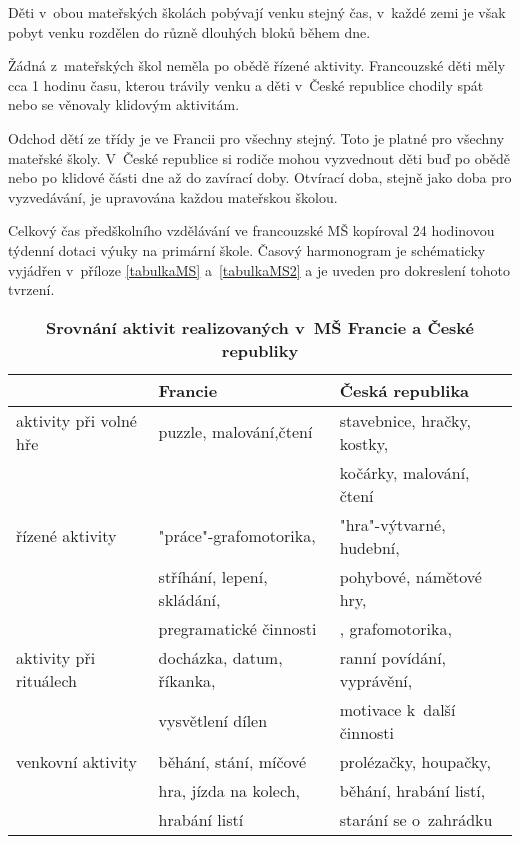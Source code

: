 	Děti v~obou mateřských školách pobývají venku stejný čas, v~každé zemi je však pobyt venku rozdělen do různě dlouhých bloků během dne. 

	Žádná z~mateřských škol neměla po obědě řízené aktivity. Francouzské děti měly cca 1 hodinu času, kterou trávily venku a děti v~České republice chodily spát nebo se věnovaly klidovým aktivitám. 

	Odchod dětí ze třídy je ve Francii pro všechny stejný. Toto je platné pro všechny mateřské školy. V~České republice si rodiče mohou vyzvednout děti buď po obědě nebo po klidové části dne až do zavírací doby. Otvírací doba, stejně jako doba pro vyzvedávání, je upravována každou mateřskou školou.

	Celkový čas předškolního vzdělávání ve francouzské MŠ kopíroval 24 hodinovou týdenní dotaci výuky na primární škole. Časový harmonogram je schématicky vyjádřen v~příloze \ref{tabulkaMS} a~\ref{tabulkaMS2} a je uveden pro dokreslení tohoto tvrzení.


\begin{table}[h]
	\center
	\begin{tabular}{|l|l|l|}
	\hline
	\rowcolor{grey}
								& \textbf{Francie}				& \textbf{Česká republika}	\\
	\hline
	\hline
\rowcolor{grey!10}	 aktivity při volné hře	&puzzle, malování,čtení 	&stavebnice, hračky, kostky,\\ 
\rowcolor{grey!10}	 						&							&kočárky, malování, čtení \\ 
\rowcolor{grey!50}	 řízené aktivity  		&"práce"-grafomotorika, 	&"hra"-výtvarné, hudební, \\ 
\rowcolor{grey!50}	 						&stříhání, lepení, skládání,&pohybové, námětové hry, \\ 
\rowcolor{grey!50}	 						&pregramatické činnosti 	&, grafomotorika, \\
\rowcolor{grey!10}	 aktivity při rituálech &docházka, datum, říkanka, 	&ranní povídání, vyprávění,\\ 
\rowcolor{grey!10}	 						&vysvětlení dílen			& motivace k~další činnosti\\ 
\rowcolor{grey!50}   venkovní aktivity 		& běhání, stání, míčové		& prolézačky, houpačky, \\
\rowcolor{grey!50}							&hra, jízda na kolech, 		&běhání, hrabání listí,	\\
\rowcolor{grey!50}							&hrabání listí				&starání se o~zahrádku	\\
	 \hline
	\end{tabular}
	
	\caption{ \textbf{Srovnání aktivit realizovaných v~MŠ Francie a České republiky}
	}
	\label{srovnaniaktivit}
\end{table}
	
